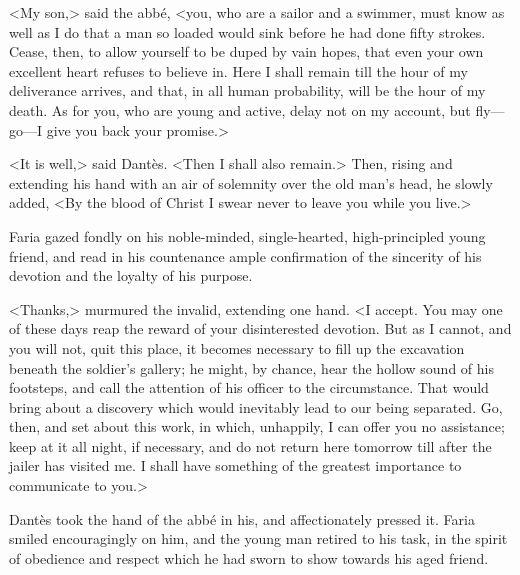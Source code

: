  <My son,> said the abbé, <you, who are a sailor and a swimmer, must know as well as I do that a man so loaded would sink before he had done fifty strokes. Cease, then, to allow yourself to be duped by vain hopes, that even your own excellent heart refuses to believe in. Here I shall remain till the hour of my deliverance arrives, and that, in all human probability, will be the hour of my death. As for you, who are young and active, delay not on my account, but fly—go—I give you back your promise.> 

 <It is well,> said Dantès. <Then I shall also remain.> Then, rising and extending his hand with an air of solemnity over the old man's head, he slowly added, <By the blood of Christ I swear never to leave you while you live.> 

 Faria gazed fondly on his noble-minded, single-hearted, high-principled young friend, and read in his countenance ample confirmation of the sincerity of his devotion and the loyalty of his purpose. 

 <Thanks,> murmured the invalid, extending one hand. <I accept. You may one of these days reap the reward of your disinterested devotion. But as I cannot, and you will not, quit this place, it becomes necessary to fill up the excavation beneath the soldier's gallery; he might, by chance, hear the hollow sound of his footsteps, and call the attention of his officer to the circumstance. That would bring about a discovery which would inevitably lead to our being separated. Go, then, and set about this work, in which, unhappily, I can offer you no assistance; keep at it all night, if necessary, and do not return here tomorrow till after the jailer has visited me. I shall have something of the greatest importance to communicate to you.> 

 Dantès took the hand of the abbé in his, and affectionately pressed it. Faria smiled encouragingly on him, and the young man retired to his task, in the spirit of obedience and respect which he had sworn to show towards his aged friend. 